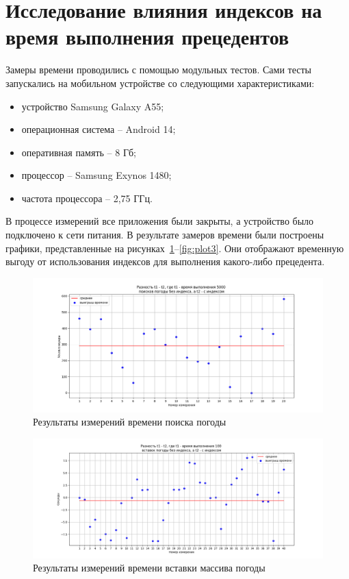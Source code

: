 \section{Исследование влияния индексов на время выполнения прецедентов}
Замеры времени проводились с помощью модульных тестов.
Сами тесты запускались на мобильном устройстве со следующими характеристиками:
\begin{itemize}
    \item устройство Samsung Galaxy A55;
    \item операционная система -- Android 14;
    \item оперативная память -- 8 Гб;
    \item процессор -- Samsung Exynos 1480;
    \item частота процессора -- 2,75 ГГц.
\end{itemize}
В процессе измерений все приложения были закрыты, а устройство было подключено к сети питания.
В результате замеров времени были построены графики, представленные на рисунках~\ref{fig:plot1}--\ref{fig:plot3}.
Они отображают временную выгоду от использования индексов для выполнения какого-либо прецедента.

\begin{figure}[H]
	\centering
	\includegraphics[width=\textwidth]{tools/img/plot1.png}
	\caption{
        Результаты измерений времени поиска погоды
    }
	\label{fig:plot1}
\end{figure}

\begin{figure}[H]
	\centering
	\includegraphics[width=\textwidth]{tools/img/plot2.png}
	\caption{
        Результаты измерений времени вставки массива погоды
    }
	\label{fig:plot2}
\end{figure}

